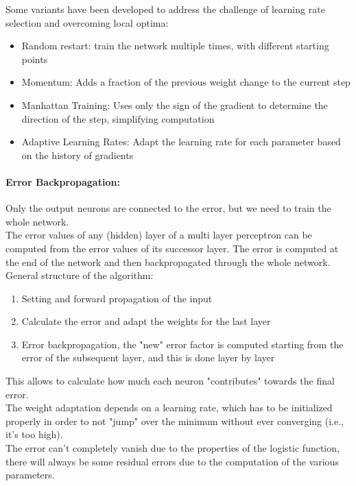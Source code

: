 Some variants have been developed to address the challenge of learning rate selection and overcoming local optima:
\begin{itemize}
	\item Random restart: train the network multiple times, with different starting points
	\item Momentum: Adds a fraction of the previous weight change to the current step
	\item Manhattan Training: Uses only the sign of the gradient to determine the direction of the step, simplifying computation
	\item Adaptive Learning Rates: Adapt the learning rate for each parameter based on the history of gradients
\end{itemize}

\paragraph{Error Backpropagation:} Only the output neurons are connected to the error, but we need to train the whole network. \\
The error values of any (hidden) layer of a multi layer perceptron can be computed from the error values of its successor layer. The error is computed at the end of the network and then backpropagated through the whole network.\\
General structure of the algorithm:
\begin{enumerate}
	\item Setting and forward propagation of the input
	\item Calculate the error and adapt the weights for the last layer
	\item Error backpropagation, the "new" error factor is computed starting from the error of the subsequent layer, and this is done layer by layer
\end{enumerate}
This allows to calculate how much each neuron "contributes" towards the final error.\\

The weight adaptation depends on a learning rate, which has to be initialized properly in order to not "jump" over the minimum without ever converging (i.e., it's too high).\\

The error can’t completely vanish due to the properties of the logistic function, there will always be some residual errors due to the computation of the various parameters.\\

